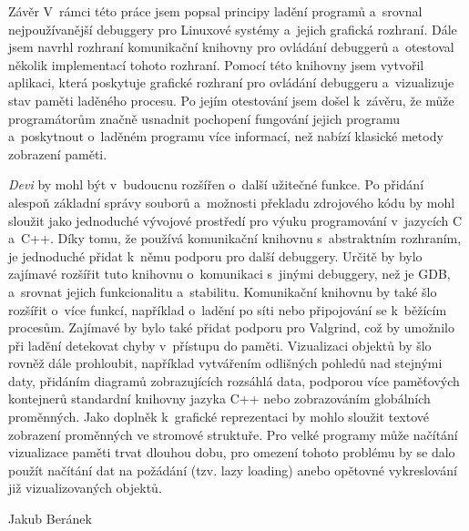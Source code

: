\documentclass[czech,bachelor,male,python,dept460,hidelinks]{diploma}						%
\newcommand{\parspace}[1][]{
	\ifthenelse{\isempty{#1}}{\vspace{0mm}}{\vspace{#1}}
	\par
}
\begin{document}
\begin{section}{Závěr}
\label{sec:Conclusion}
	V~rámci této práce jsem popsal principy ladění programů a~srovnal nejpoužívanější debuggery pro Linuxové systémy a~jejich grafická rozhraní. Dále jsem
	navrhl rozhraní komunikační knihovny pro ovládání debuggerů a~otestoval několik implementací tohoto rozhraní. Pomocí této knihovny jsem
	vytvořil aplikaci, která poskytuje grafické rozhraní pro ovládání debuggeru a~vizualizuje stav paměti laděného procesu. Po jejím otestování jsem
	došel k~závěru, že může programátorům značně usnadnit pochopení fungování jejich programu a~poskytnout o~laděném programu více informací, než
	nabízí klasické metody zobrazení paměti.

	\parspace \textit{Devi} by mohl být v~budoucnu rozšířen o~další užitečné funkce. Po přidání alespoň základní správy souborů a~možnosti překladu
	zdrojového kódu by mohl sloužit jako jednoduché vývojové prostředí pro výuku programování v~jazycích C a~C++.
	Díky tomu, že používá komunikační knihovnu s~abstraktním rozhraním, je jednoduché přidat k~němu podporu pro další debuggery. Určitě by bylo
	zajímavé rozšířit tuto knihovnu o~komunikaci s~jinými debuggery, než je GDB, a~srovnat jejich funkcionalitu a~stabilitu.
	Komunikační knihovnu by také šlo rozšířit o~více funkcí, například o~ladění po síti nebo připojování se k~běžícím procesům.
	Zajímavé by bylo také přidat podporu pro Valgrind, což by umožnilo při ladění detekovat chyby v~přístupu do paměti.
	Vizualizaci objektů by šlo rovněž dále prohloubit, například vytvářením odlišných pohledů nad stejnými daty, přidáním diagramů zobrazujících rozsáhlá data,
	podporou více paměťových kontejnerů standardní knihovny jazyka C++ nebo zobrazováním globálních proměnných.
	Jako doplněk k~grafické reprezentaci by mohlo sloužit textové zobrazení proměnných ve stromové struktuře.
	Pro velké programy může načítání vizualizace paměti trvat dlouhou dobu, pro omezení tohoto problému by se dalo použít načítání dat na požádání
	(tzv. lazy loading) anebo opětovné vykreslování již vizualizovaných objektů.
\end{section}

\bigskip
\begin{flushright}
Jakub Beránek
\end{flushright}

\printbibheading[title=Literatura, heading=bibintoc]
\printbibliography[heading=none]
\end{document}
